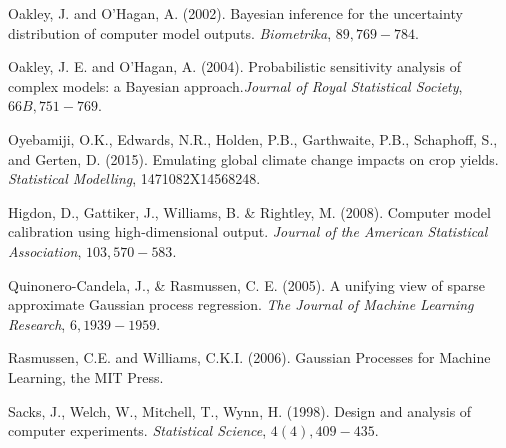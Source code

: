 \begin{thebibliography}{94}
 Oakley, J. and O'Hagan, A. (2002). Bayesian inference for the uncertainty distribution of computer model outputs. {\it Biometrika}, $89, 769-784$.

 Oakley, J. E. and O'Hagan, A. (2004). Probabilistic sensitivity analysis of complex models: a Bayesian approach.{\it Journal of Royal Statistical Society}, $66B, 751-769$.


 Oyebamiji, O.K., Edwards, N.R., Holden, P.B., Garthwaite, P.B., Schaphoff, S., and Gerten, D. (2015). Emulating global climate change impacts on crop yields. {\it Statistical Modelling}, 1471082X14568248.


 Higdon, D., Gattiker, J., Williams, B. \& Rightley, M. (2008). Computer model calibration using high-dimensional output. {\it Journal of the American Statistical Association}, $103, 570-583$.

 Quinonero-Candela, J., \& Rasmussen, C. E. (2005). A unifying view of sparse approximate Gaussian process regression. {\it The Journal of Machine Learning Research}, $6, 1939-1959$.


 Rasmussen, C.E. and Williams, C.K.I. (2006). Gaussian Processes for Machine Learning, the MIT Press.





 Sacks, J., Welch, W., Mitchell, T., Wynn, H. (1998). Design and analysis of computer experiments. {\it Statistical Science}, $4(4), 409-435$.


\end{thebibliography}
